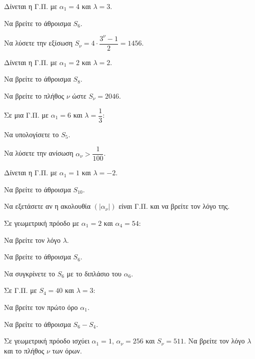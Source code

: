 \documentclass[11pt,a4paper,modern]{FFExercises}
\begin{document}
\askhsh
Δίνεται η Γ.Π. με $\alpha_1 = 4$ και $\lambda = 3$.
\begin{alist}
  \item Να βρείτε το άθροισμα $S_6$.
  \item Να λύσετε την εξίσωση $S_\nu = 4 \cdot \dfrac{3^\nu - 1}{2} = 1456$.
\end{alist}

\askhsh
Δίνεται η Γ.Π. με $\alpha_1 = 2$ και $\lambda = 2$.
\begin{alist}
  \item Να βρείτε το άθροισμα $S_8$.
  \item Να βρείτε το πλήθος $\nu$ ώστε $S_\nu = 2046$.
\end{alist}

\askhsh
Σε μια Γ.Π. με $\alpha_1 = 6$ και $\lambda = \dfrac{1}{3}$:
\begin{alist}
  \item Να υπολογίσετε το $S_5$.
  \item Να λύσετε την ανίσωση $\alpha_\nu > \dfrac{1}{100}$.
\end{alist}

\askhsh
Δίνεται η Γ.Π. με $\alpha_1 = 1$ και $\lambda = -2$.
\begin{alist}
  \item Να βρείτε το άθροισμα $S_{10}$.
  \item Να εξετάσετε αν η ακολουθία $(|\alpha_\nu|)$ είναι Γ.Π. και να βρείτε τον λόγο της.
\end{alist}

\askhsh
Σε γεωμετρική πρόοδο με $\alpha_1 = 2$ και $\alpha_4 = 54$:
\begin{alist}
  \item Να βρείτε τον λόγο $\lambda$.
  \item Να βρείτε το άθροισμα $S_6$.
  \item Να συγκρίνετε το $S_6$ με το διπλάσιο του $\alpha_6$.
\end{alist}

\askhsh
Σε Γ.Π. με $S_4 = 40$ και $\lambda = 3$:
\begin{alist}
  \item Να βρείτε τον πρώτο όρο $\alpha_1$.
  \item Να βρείτε το άθροισμα $S_6 - S_4$.
\end{alist}

\askhsh
Σε γεωμετρική πρόοδο ισχύει $\alpha_1 = 1$, $\alpha_\nu = 256$ και $S_\nu = 511$. Να βρείτε τον λόγο $\lambda$ και το πλήθος $\nu$ των όρων.
\end{document}
